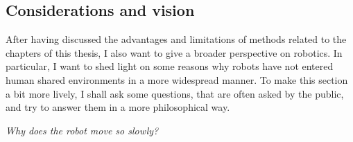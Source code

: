 

\subsection{Considerations and vision}
\label{sec:discussion_vision}

After having discussed the advantages and limitations of
methods related to the chapters of this thesis, I also want
to give a broader perspective on robotics. In particular, I
want to shed light on some reasons why robots have not
entered human shared environments in a more widespread
manner. To make this section a bit more lively, I shall ask
some questions, that are often asked by the public, and
try to answer them in a more philosophical way.


\textit{Why does the robot move so slowly?}

